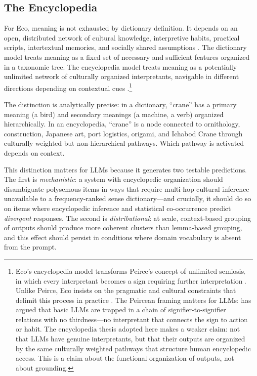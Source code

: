 \documentclass[12pt,a4paper]{article}
\begin{document}
\subsection{The Encyclopedia}

For Eco, meaning is not exhausted by dictionary definition. It depends on
an open, distributed network of cultural knowledge, interpretive habits,
practical scripts, intertextual memories, and socially shared assumptions
\citep{Eco1984}. The dictionary model treats meaning as a fixed set of
necessary and sufficient features organized in a taxonomic tree. The
encyclopedia model treats meaning as a potentially unlimited network of
culturally organized interpretants, navigable in different directions
depending on contextual cues \citep{Eco1976,Eco1984}.\footnote{Eco's
encyclopedia model transforms Peirce's concept of unlimited semiosis, in
which every interpretant becomes a sign requiring further interpretation
\citep{Peirce1931}. Unlike Peirce, Eco insists on the pragmatic and
cultural constraints that delimit this process in practice \citep{Eco1990}.
The Peircean framing matters for LLMs: \citet{HallMirrors2026} has argued
that basic LLMs are trapped in a chain of signifier-to-signifier relations
with no thirdness---no interpretant that connects the sign to action or
habit. The encyclopedia thesis adopted here makes a weaker claim: not that
LLMs have genuine interpretants, but that their outputs are organized by the
same culturally weighted pathways that structure human encyclopedic access.
This is a claim about the functional organization of outputs, not about
grounding.}

The distinction is analytically precise: in a dictionary, ``crane'' has a
primary meaning (a bird) and secondary meanings (a machine, a verb) organized
hierarchically. In an encyclopedia, ``crane'' is a node connected to
ornithology, construction, Japanese art, port logistics, origami, and Ichabod
Crane through culturally weighted but non-hierarchical pathways. Which pathway
is activated depends on context.

This distinction matters for LLMs because it generates two testable predictions.
The first is \emph{mechanistic}: a system with encyclopedic organization should
disambiguate polysemous items in ways that require multi-hop cultural inference
unavailable to a frequency-ranked sense dictionary---and crucially, it should
do so on items where encyclopedic inference and statistical co-occurrence
predict \emph{divergent} responses. The second is \emph{distributional}: at
scale, context-based grouping of outputs should produce more coherent clusters
than lemma-based grouping, and this effect should persist in conditions where
domain vocabulary is absent from the prompt.
\end{document}
